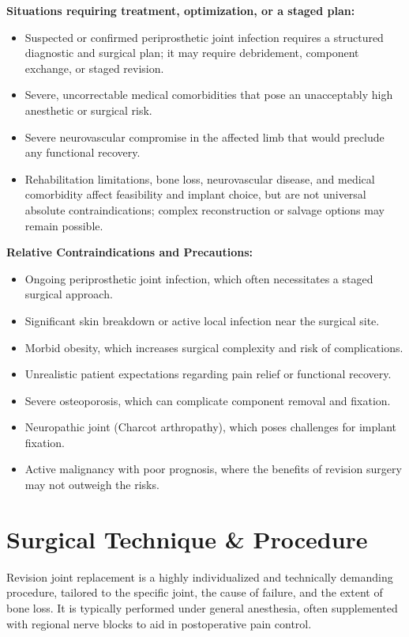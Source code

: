 \textbf{Situations requiring treatment, optimization, or a staged plan:}
\begin{itemize}
  \item Suspected or confirmed periprosthetic joint infection requires a structured diagnostic and surgical plan; it may require debridement, component exchange, or staged revision.
  
  \item Severe, uncorrectable medical comorbidities that pose an unacceptably high anesthetic or surgical risk.
  
  \item Severe neurovascular compromise in the affected limb that would preclude any functional recovery.
  
  \item Rehabilitation limitations, bone loss, neurovascular disease, and medical comorbidity affect feasibility and implant choice, but are not universal absolute contraindications; complex reconstruction or salvage options may remain possible.
\end{itemize}

\textbf{Relative Contraindications and Precautions:}
\begin{itemize}
  \item Ongoing periprosthetic joint infection, which often necessitates a staged surgical approach.
  
  \item Significant skin breakdown or active local infection near the surgical site.
  
  \item Morbid obesity, which increases surgical complexity and risk of complications.
  
  \item Unrealistic patient expectations regarding pain relief or functional recovery.
  
  \item Severe osteoporosis, which can complicate component removal and fixation.
  
  \item Neuropathic joint (Charcot arthropathy), which poses challenges for implant fixation.
  
  \item Active malignancy with poor prognosis, where the benefits of revision surgery may not outweigh the risks.
\end{itemize}

\section*{Surgical Technique \& Procedure}
Revision joint replacement is a highly individualized and technically demanding procedure, tailored to the specific joint, the cause of failure, and the extent of bone loss. It is typically performed under general anesthesia, often supplemented with regional nerve blocks to aid in postoperative pain control.

